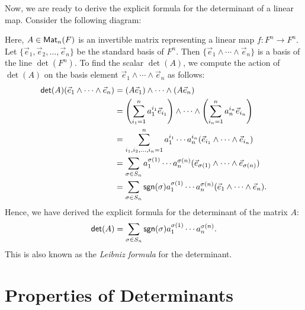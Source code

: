Now, we are ready to derive the explicit formula for the determinant of a linear map. Consider the following diagram:
\begin{center}
\end{center}
Here, $A \in \operatorname{\text{\normalfont\sffamily Mat}}_n(F)$ is an invertible matrix representing a linear map $f \colon F^n \to F^n$. Let $\{ \vec{e}_1, \vec{e}_2, \ldots, \vec{e}_n \}$ be the standard basis of $F^n$. Then $\{ \vec{e}_1 \wedge \cdots \wedge \vec{e}_n \}$ is a basis of the line $\det(F^n)$. To find the scalar $\det(A)$, we compute the action of $\det(A)$ on the basis element $\vec{e}_1 \wedge \cdots \wedge \vec{e}_n$ as follows:
\begin{align*}
  \operatorname{\text{\normalfont\sffamily det}}(A)(\vec{e}_1 \wedge \cdots \wedge \vec{e}_n) & = (A \vec{e}_1) \wedge \cdots \wedge (A \vec{e}_n)                                                                                     \\
                                                    & = \left( \sum_{i_1 = 1}^n a^{i_1}_1 \vec{e}_{i_1} \right) \wedge \cdots \wedge \left( \sum_{i_n = 1}^n a^{i_n}_n \vec{e}_{i_n} \right) \\
                                                    & = \sum_{i_1, i_2, \ldots, i_n = 1}^n a^{i_1}_1 \cdots a^{i_n}_n (\vec{e}_{i_1} \wedge \cdots \wedge \vec{e}_{i_n})                     \\
                                                    & = \sum_{\sigma \in S_n} a^{\sigma(1)}_1 \cdots a^{\sigma(n)}_n (\vec{e}_{\sigma(1)} \wedge \cdots \wedge \vec{e}_{\sigma(n)})          \\
                                                    & = \sum_{\sigma \in S_n} \operatorname{\text{\normalfont\sffamily sgn}}(\sigma) a^{\sigma(1)}_1 \cdots a^{\sigma(n)}_n (\vec{e}_1 \wedge \cdots \wedge \vec{e}_n).
\end{align*}
Hence, we have derived the explicit formula for the determinant of the matrix $A$:
\[
  \operatorname{\text{\normalfont\sffamily det}}(A) = \sum_{\sigma \in S_n} \operatorname{\text{\normalfont\sffamily sgn}}(\sigma) a^{\sigma(1)}_1 \cdots a^{\sigma(n)}_n.
\]
This is also known as the \emph{Leibniz formula} for the determinant.

\section{Properties of Determinants}

